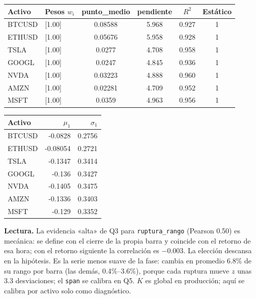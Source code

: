 \documentclass[11pt,a4paper]{article}
\newcommand{\code}[1]{\texttt{\small #1}}
\begin{document}
\begin{center}\end{center}
\begin{center}\small\setlength{\tabcolsep}{5pt}
\begin{tabular}{llcccc}\toprule
Activo & Pesos $w_i$ & punto\_medio & pendiente & $R^2$ & Estático \\\midrule
BTCUSD & [1.00] & 0.08588 & 5.968 & 0.927 & 1 \\
ETHUSD & [1.00] & 0.05676 & 5.958 & 0.928 & 1 \\
TSLA & [1.00] & 0.0277 & 4.708 & 0.958 & 1 \\
GOOGL & [1.00] & 0.0247 & 4.845 & 0.936 & 1 \\
NVDA & [1.00] & 0.03223 & 4.888 & 0.960 & 1 \\
AMZN & [1.00] & 0.02281 & 4.709 & 0.952 & 1 \\
MSFT & [1.00] & 0.0359 & 4.963 & 0.956 & 1 \\
\bottomrule\end{tabular}

\medskip
\begin{tabular}{lrr}\toprule
Activo & $\mu_1$ & $\sigma_1$ \\\midrule
BTCUSD & -0.0828 & 0.2756 \\
ETHUSD & -0.08054 & 0.2721 \\
TSLA & -0.1347 & 0.3414 \\
GOOGL & -0.136 & 0.3427 \\
NVDA & -0.1405 & 0.3475 \\
AMZN & -0.1336 & 0.3403 \\
MSFT & -0.129 & 0.3352 \\
\bottomrule\end{tabular}\end{center}
\textbf{Lectura.} La evidencia «alta» de Q3 para \code{ruptura\_rango} (Pearson 0.50) es mecánica: se define con el cierre de la propia barra y coincide con el retorno de esa hora; con el retorno siguiente la correlación es $-0.003$. La elección descansa en la hipótesis. Es la serie menos suave de la fase: cambia en promedio 6.8\% de su rango por barra (las demás, 0.4\%--3.6\%), porque cada ruptura mueve $z$ unas 3.3 desviaciones; el \code{span} se calibra en Q5. $K$ es global en producción; aquí se calibra por activo solo como diagnóstico.
\newpage
\end{document}
